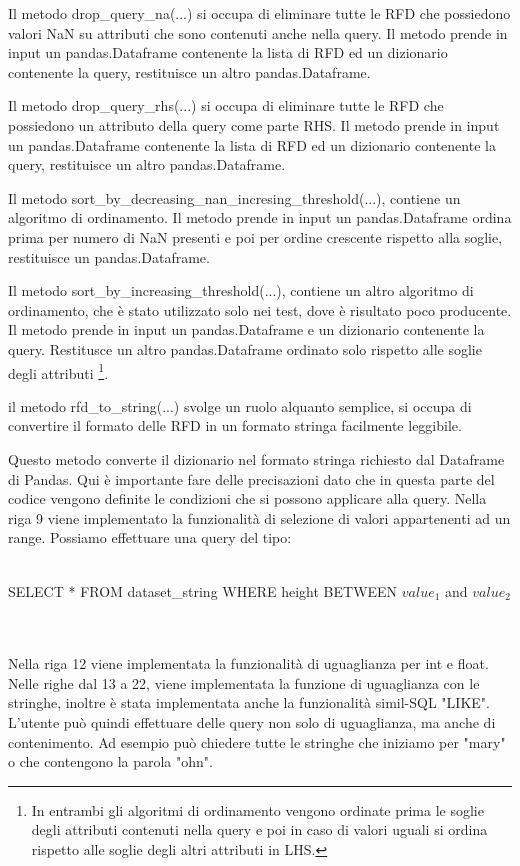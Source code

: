 Il metodo drop{\_}query{\_}na(...) si occupa di eliminare tutte le RFD che possiedono valori NaN su attributi che sono contenuti anche nella query. Il metodo prende in input un pandas.Dataframe contenente la lista di RFD ed un dizionario contenente la query, restituisce un altro pandas.Dataframe.

Il metodo drop{\_}query{\_}rhs(...) si occupa di eliminare tutte le RFD che possiedono un attributo della query come parte RHS. Il metodo prende in input un pandas.Dataframe contenente la lista di RFD ed un dizionario contenente la query, restituisce un altro pandas.Dataframe.

Il metodo sort{\_}by{\_}decreasing{\_}nan{\_}incresing{\_}threshold(...), contiene un algoritmo di ordinamento. Il metodo prende in input un pandas.Dataframe ordina prima per numero di NaN presenti e poi per ordine crescente rispetto alla soglie, restituisce un pandas.Dataframe.

Il metodo sort{\_}by{\_}increasing{\_}threshold(...), contiene un altro algoritmo di ordinamento, che è stato utilizzato solo nei test, dove è risultato poco producente. Il metodo prende in input un pandas.Dataframe e un dizionario contenente la query. Restitusce un altro pandas.Dataframe ordinato solo rispetto alle soglie degli attributi \footnote{In entrambi gli algoritmi di ordinamento vengono ordinate prima le soglie degli attributi contenuti nella query e poi in caso di valori uguali si ordina rispetto alle soglie degli altri attributi in LHS.}.

il metodo rfd{\_}to{\_}string(...) svolge un ruolo alquanto semplice, si occupa di convertire il formato delle RFD in un formato stringa facilmente leggibile.

Questo metodo converte il dizionario nel formato stringa richiesto dal Dataframe di Pandas.
Qui è importante fare delle precisazioni dato che in  questa parte del codice vengono definite le condizioni che si possono applicare alla query.
Nella riga 9 viene implementato la funzionalità di selezione di valori appartenenti ad un range. Possiamo effettuare una query del tipo:
\\~\\
\centerline{SELECT * FROM dataset{\_}string WHERE height BETWEEN $value_1$ and $value_2$}
\\~\\
Nella riga 12 viene implementata la funzionalità di uguaglianza per int e float.
Nelle righe dal 13 a 22, viene implementata la funzione di uguaglianza con le stringhe, inoltre è stata implementata anche la funzionalità simil-SQL "LIKE". L'utente può quindi effettuare delle query non solo di uguaglianza, ma anche di contenimento. Ad esempio può chiedere tutte le stringhe che iniziamo per "mary" o che contengono la parola "ohn".

